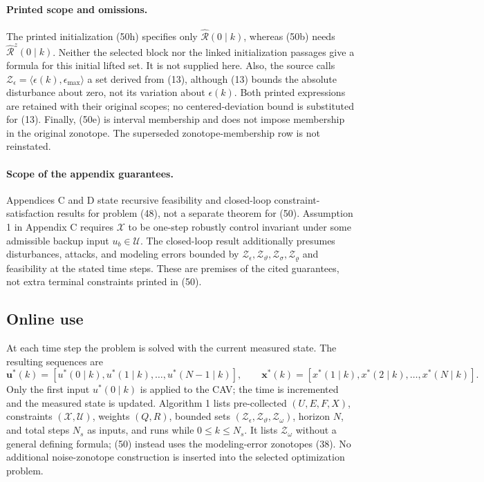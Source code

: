 \documentclass{article}
\begin{document}
\paragraph{Printed scope and omissions.}
The printed initialization (50h) specifies only $\hat{\mathcal{R}}(0\mid k)$, whereas (50b) needs $\hat{\mathcal{R}}^z(0\mid k)$. Neither the selected block nor the linked initialization passages give a formula for this initial lifted set. It is not supplied here. Also, the source calls $\mathcal{Z}_{\epsilon}=\langle\epsilon(k),\epsilon_{\max}\rangle$ a set derived from (13), although (13) bounds the absolute disturbance about zero, not its variation about $\epsilon(k)$. Both printed expressions are retained with their original scopes; no centered-deviation bound is substituted for (13). Finally, (50e) is interval membership and does not impose membership in the original zonotope. The superseded zonotope-membership row is not reinstated.

\paragraph{Scope of the appendix guarantees.}
Appendices C and D state recursive feasibility and closed-loop constraint-satisfaction results for problem (48), not a separate theorem for (50). Assumption 1 in Appendix C requires $\mathcal{X}$ to be one-step robustly control invariant under some admissible backup input $u_b\in\mathcal{U}$. The closed-loop result additionally presumes disturbances, attacks, and modeling errors bounded by $\mathcal{Z}_{\epsilon},\mathcal{Z}_{\vartheta},\mathcal{Z}_{\sigma},\mathcal{Z}_{\varrho}$ and feasibility at the stated time steps. These are premises of the cited guarantees, not extra terminal constraints printed in (50).

\subsection*{Online use}
At each time step the problem is solved with the current measured state. The resulting sequences are
\[
\mathbf{u}^*(k)=[u^*(0\mid k),u^*(1\mid k),\ldots,u^*(N-1\mid k)],\qquad
\mathbf{x}^*(k)=[x^*(1\mid k),x^*(2\mid k),\ldots,x^*(N\mid k)].
\]
Only the first input $u^*(0\mid k)$ is applied to the CAV; the time is incremented and the measured state is updated. Algorithm 1 lists pre-collected $(U,E,F,X)$, constraints $(\mathcal{X},\mathcal{U})$, weights $(Q,R)$, bounded sets $(\mathcal{Z}_{\epsilon},\mathcal{Z}_{\vartheta},\mathcal{Z}_{\omega})$, horizon $N$, and total steps $N_s$ as inputs, and runs while $0\leq k\leq N_s$. It lists $\mathcal{Z}_{\omega}$ without a general defining formula; (50) instead uses the modeling-error zonotopes (38). No additional noise-zonotope construction is inserted into the selected optimization problem.
\end{document}
